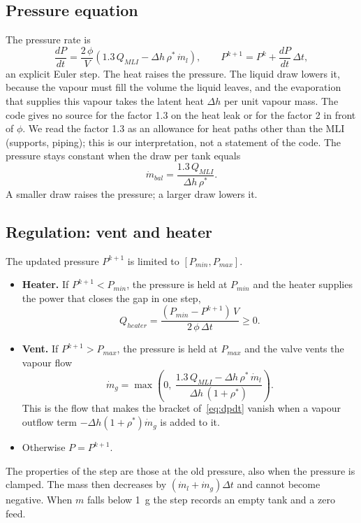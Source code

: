 \documentclass[a4paper,11pt]{article}
\newcommand{\Qmli}{Q_{MLI}}
\newcommand{\mdot}{\dot m}
\begin{document}
\subsection{Pressure equation}
The pressure rate is
\begin{equation}
  \frac{dP}{dt} = \frac{2\,\phi}{V}\left(1.3\,\Qmli - \Delta h\,\rho^*\,\mdot_l\right),
  \qquad
  P^{k+1} = P^k + \frac{dP}{dt}\,\Delta t,
  \label{eq:dpdt}
\end{equation}
an explicit Euler step. The heat raises the pressure. The liquid draw lowers it, because the
vapour must fill the volume the liquid leaves, and the evaporation that supplies this vapour
takes the latent heat $\Delta h$ per unit vapour mass. The code gives no source for the factor
1.3 on the heat leak or for the factor 2 in front of $\phi$. We read the factor 1.3 as an
allowance for heat paths other than the MLI (supports, piping); this is our interpretation, not a
statement of the code. The pressure stays constant when the draw per tank equals
\begin{equation}
  \mdot_{bal} = \frac{1.3\,\Qmli}{\Delta h\,\rho^*}.
  \label{eq:mbal}
\end{equation}
A smaller draw raises the pressure; a larger draw lowers it.

\subsection{Regulation: vent and heater}
The updated pressure $P^{k+1}$ is limited to $[P_{min}, P_{max}]$.
\begin{itemize}
\item \textbf{Heater.} If $P^{k+1} < P_{min}$, the pressure is held at $P_{min}$ and the heater
  supplies the power that closes the gap in one step,
  \begin{equation}
    Q_{heater} = \frac{(P_{min} - P^{k+1})\,V}{2\,\phi\,\Delta t} \ge 0.
  \end{equation}
\item \textbf{Vent.} If $P^{k+1} > P_{max}$, the pressure is held at $P_{max}$ and the valve
  vents the vapour flow
  \begin{equation}
    \mdot_g = \max\!\left(0,\ \frac{1.3\,\Qmli - \Delta h\,\rho^*\,\mdot_l}{\Delta h\,(1 + \rho^*)}\right).
    \label{eq:vent}
  \end{equation}
  This is the flow that makes the bracket of~\eqref{eq:dpdt} vanish when a vapour outflow
  term $-\Delta h(1+\rho^*)\mdot_g$ is added to it.
\item Otherwise $P = P^{k+1}$.
\end{itemize}
The properties of the step are those at the old pressure, also when the pressure is clamped.
The mass then decreases by $(\mdot_l + \mdot_g)\Delta t$ and cannot become negative. When $m$
falls below \SI{1}{g} the step records an empty tank and a zero feed.
\end{document}
